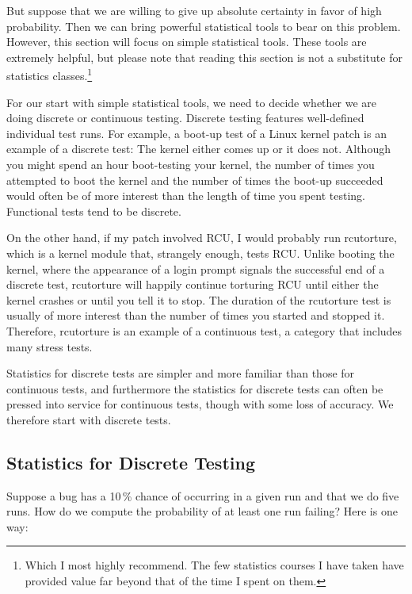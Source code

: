 But suppose that we are willing to give up absolute certainty in favor
of high probability.
Then we can bring powerful statistical tools to bear on this problem.
However, this section will focus on simple statistical tools.
These tools are extremely helpful, but please note that reading this
section is not a substitute for statistics classes.\footnote{
	Which I most highly recommend.
	The few statistics courses I have taken have provided value
	far beyond that of the time I spent on them.}

For our start with simple statistical tools, we need to decide whether
we are doing discrete or continuous testing.
Discrete testing features well-defined individual test runs.
For example, a boot-up test of a Linux kernel patch is an example
of a discrete test:
The kernel either comes up or it does not.
Although you might spend an hour boot-testing your kernel, the number of
times you attempted to boot the kernel and the number of times the
boot-up succeeded would often be of more interest than the length
of time you spent testing.
Functional tests tend to be discrete.

On the other hand, if my patch involved RCU, I would probably run
rcutorture, which is a kernel module that, strangely enough, tests RCU\@.
Unlike booting the kernel, where the appearance of a login prompt
signals the successful end of a discrete test, rcutorture will happily
continue torturing RCU until either the kernel crashes or until you
tell it to stop.
The duration of the rcutorture test is usually of more
interest than the number of times you started and stopped it.
Therefore, rcutorture is an example of a continuous test, a category
that includes many stress tests.

Statistics for discrete tests are simpler and more familiar than those
for continuous tests, and furthermore the statistics for discrete tests
can often be pressed into service for continuous tests, though with some
loss of accuracy.
We therefore start with discrete tests.

\subsection{Statistics for Discrete Testing}
\label{sec:debugging:Statistics for Discrete Testing}

Suppose a bug has a 10\,\% chance of occurring in a given run and that
we do five runs.
How do we compute the probability of at least one run failing?
Here is one way:

